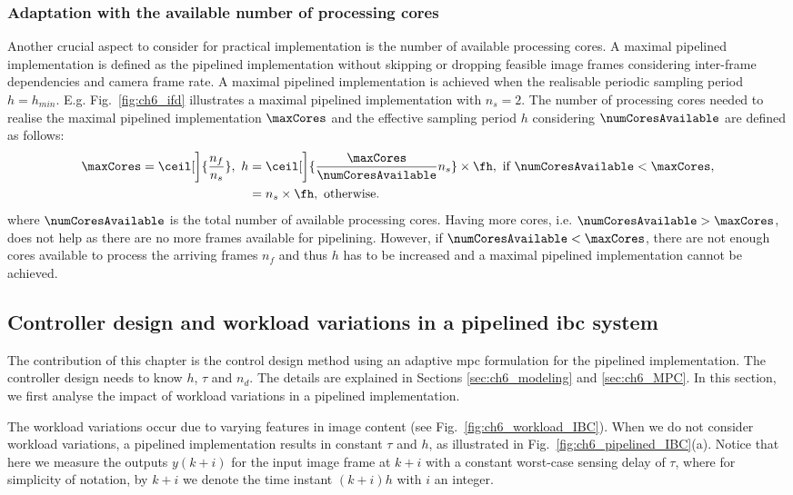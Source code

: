 \subsubsection{Adaptation with the available number of processing cores}
\label{sec:ch6_adaptation_cores}
Another crucial aspect to consider for practical implementation is the number of available processing cores.
A maximal pipelined implementation is defined as the pipelined implementation without skipping or dropping feasible image frames considering inter-frame dependencies and camera frame rate. 
A maximal pipelined implementation is achieved when the realisable periodic sampling period $h=h_{min}$. 
E.g. Fig.~\ref{fig:ch6_ifd} illustrates a maximal pipelined implementation with $n_s=2$.
The number of processing cores needed to realise the maximal pipelined implementation $\maxCores$ and the effective sampling period $h$ considering $\numCoresAvailable$ are defined as follows:
\begin{equation}
\begin{split}
    \maxCores=\ceil[\bigg]{\frac{n_f}{n_s}},\ 
        h & =\ceil[\bigg]{\frac{\maxCores}{\numCoresAvailable} n_s} \times  \fh,\ \text{if } \numCoresAvailable < \maxCores,\\
 & = n_s \times \fh,\ \text{otherwise.} \nonumber
 \end{split}
\end{equation}
where $\numCoresAvailable$ is the total number of available processing cores.
Having more cores, i.e. $\numCoresAvailable > \maxCores$, does not help as there are no more frames available for pipelining. 
However, if $\numCoresAvailable < \maxCores$, there are not enough cores available to process the arriving frames $n_f$ and thus $h$ has to be increased and a maximal pipelined implementation cannot be achieved.

\subsection{Controller design and workload variations in a pipelined \gls{ibc} system}
\label{sec:ch6_IBCworkvar}
The contribution of this chapter is the control design method using an adaptive \gls{mpc} formulation for the pipelined implementation. The controller design needs to know $h$, $\tau$ and $n_d$. The details are explained in Sections \ref{sec:ch6_modeling} and \ref{sec:ch6_MPC}.
In this section, we first analyse the impact of workload variations in a pipelined implementation.

The workload variations occur due to varying features in image content (see Fig.~\ref{fig:ch6_workload_IBC}).
When we do not consider workload variations, a pipelined implementation results in constant $\tau$ and $h$, as illustrated in Fig.~\ref{fig:ch6_pipelined_IBC}(a). 
Notice that here we measure the outputs $y(k+i)$ for the input image frame at $k+i$ with a constant worst-case sensing delay of $\tau$, where for simplicity of notation, by $k+i$ we denote the time instant $(k+i)h$ with $i$ an integer. 

